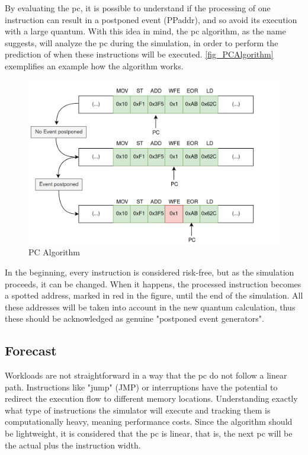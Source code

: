 By evaluating the \gls{pc}, it is possible to understand if the processing of one instruction can result in a postponed event (PPaddr), and so avoid its execution with a large quantum. With this idea in mind, the \gls{pc} algorithm, as the name suggests, will analyze the \gls{pc} during the simulation, in order to perform the prediction of when these instructions will be executed. \autoref{fig_PCAlgorithm} exemplifies an example how the algorithm works.

\begin{figure}[h!]
	\centering
 	\includegraphics[width=0.7\linewidth]{Images/PCAlgorithm.png}
 	\caption{PC Algorithm}
	 \label{fig_PCAlgorithm}
\end{figure}

In the beginning, every instruction is considered risk-free, but as the simulation proceeds, it can be changed. When it happens, the processed instruction becomes a spotted address, marked in red in the figure, until the end of the simulation. All these addresses will be taken into account in the new quantum calculation, thus these should be acknowledged as genuine "postponed event generators".





 
\subsection{Forecast}

Workloads are not straightforward in a way that the \gls{pc} do not follow a linear path. Instructions like "jump" (JMP) or interruptions have the potential to redirect the execution flow to different memory locations. Understanding exactly what type of instructions the simulator will execute and tracking them is computationally heavy, meaning performance costs. Since the algorithm should be lightweight, it is considered that the \gls{pc} is linear, that is, the next \gls{pc} will be the actual plus the instruction width. 

